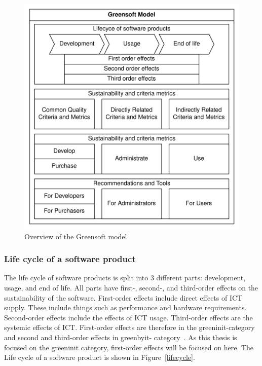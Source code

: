 \begin{figure}[H]
\caption{Overview of the Greensoft model~\cite{greensoft}}
\label{greensoftoverview}
\includegraphics[width=\textwidth]{images/greensoft.png}
\centering
\end{figure}

\subsubsection{Life cycle of a software product}
The life cycle of software products is split into 3 different parts: development, usage, and end of life. All parts have first-, second-, and third-order effects on the sustainability of the software. First-order effects include direct effects of ICT supply. These include things such as performance and hardware requirements. Second-order effects include the effects of ICT usage. Third-order effects are the systemic effects of ICT. First-order effects are therefore in the \gls{greeninit}-category and second and third-order effects in \gls{greenbyit}- category~\cite{greensoft}. As this thesis is focused on the \gls{greeninit} category, first-order effects will be focused on here. The Life cycle of a software product is shown in Figure~\ref{lifecycle}.

